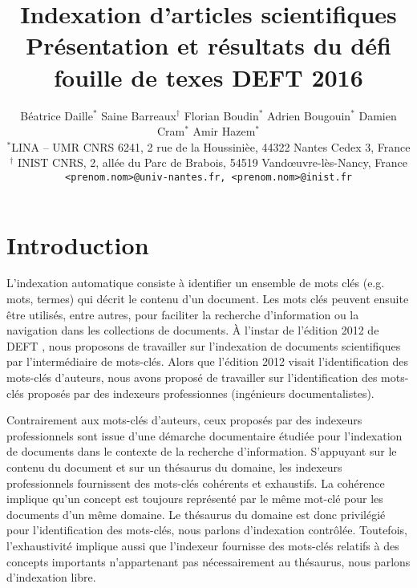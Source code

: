 \documentclass[10pt,twoside]{article}
\title{Indexation d'articles scientifiques \\ Présentation et résultats du défi fouille de texes DEFT 2016}
\author{
     Béatrice Daille$^*$ \quad{}  Saine Barreaux$^{\dag}$   \quad{} Florian Boudin$^*$  \quad{} Adrien Bougouin$^*$ \quad{} Damien Cram$^*$ \quad{} Amir Hazem$^*$\\
    {\small
        $^*$LINA -- UMR CNRS 6241,
        2 rue de la Houssinièe,
        44322 Nantes Cedex 3,
        France\\
        $^\dag$ INIST CNRS, 2, allée du Parc de Brabois, 54519 Vandœuvre-lès-Nancy, France\\
         \texttt{<prenom.nom>@univ-nantes.fr, <prenom.nom>@inist.fr}
    }\\
}
\begin{document}
    \maketitle
    
    
    
    
    \section{Introduction}
        L’indexation automatique consiste à identifier un ensemble de mots clés (e.g. mots, termes) qui décrit le contenu d’un document. Les mots clés peuvent ensuite être utilisés, entre autres, pour faciliter la recherche d’information ou la navigation dans les collections de documents.
À l’instar de l’édition 2012 de DEFT \cite{paroubek2012deft}, nous proposons de travailler sur l’indexation de documents scientifiques par l’intermédiaire de mots-clés. Alors que l’édition 2012 visait l’identification des mots-clés d’auteurs, nous avons proposé de travailler sur l’identification des mots-clés proposés par des indexeurs professionnes (ingénieurs documentalistes).

Contrairement aux mots-clés d’auteurs, ceux proposés par des indexeurs professionnels sont issue d’une démarche documentaire étudiée pour l’indexation de documents dans le contexte de la recherche d’information. S’appuyant sur le contenu du document et sur un thésaurus du domaine, les indexeurs professionnels fournissent des mots-clés cohérents et exhaustifs. La cohérence implique qu’un concept est toujours représenté par le même mot-clé pour les documents d’un même domaine. Le thésaurus du domaine est donc privilégié pour l’identification des mots-clés, nous parlons d’indexation contrôlée. Toutefois, l’exhaustivité implique aussi que l’indexeur fournisse des mots-clés relatifs à des concepts importants n’appartenant pas nécessairement au thésaurus, nous parlons d’indexation libre.
\end{document}
